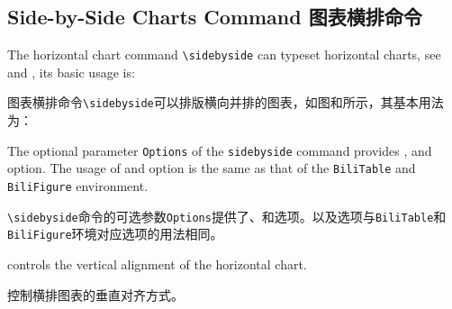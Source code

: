 

\subsection{Side-by-Side Charts Command 图表横排命令}

\begin{ParaColumn}

    The horizontal chart command \verb"\sidebyside" can typeset horizontal charts, see  and , its basic usage is:

    \switchcolumn

    图表横排命令\verb"\sidebyside"可以排版横向并排的图表，如图和所示，其基本用法为：

\end{ParaColumn}



\begin{ParaColumn}

    The optional parameter \verb"Options" of the \verb"sidebyside" command provides ,  and  option.  The usage of  and  option is the same as that of the \verb"BiliTable" and \verb"BiliFigure" environment.

    \switchcolumn

    \verb"\sidebyside"命令的可选参数\verb"Options"提供了、和选项。以及选项与\verb"BiliTable"和\verb"BiliFigure"环境对应选项的用法相同。

\end{ParaColumn}

\vspace{3pt}
\noindent
{}
\vspace{3pt}

\begin{ParaColumn}

     controls the vertical alignment of the horizontal chart.
    
    \switchcolumn

    控制横排图表的垂直对齐方式。

\end{ParaColumn}

